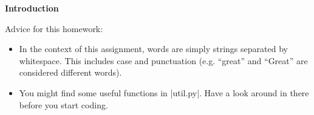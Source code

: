 {\bf Introduction}

Advice for this homework:
\begin{itemize}
  \item In the context of this assignment, words are simply strings separated
  by whitespace. This includes case and punctuation (e.g. ``great'' and
  ``Great'' are considered different words).
  \item You might find some useful functions in |util.py|.  Have a look
  around in there before you start coding.
\end{itemize}

